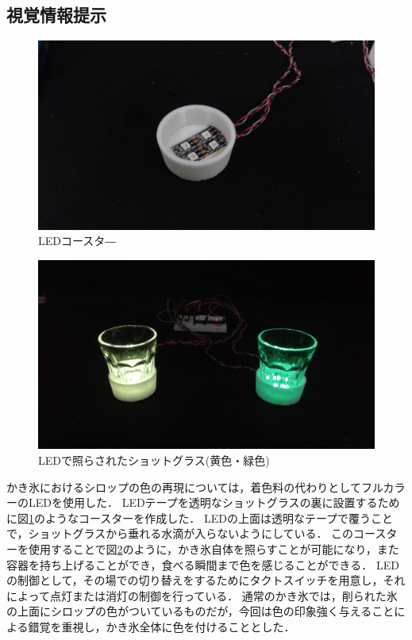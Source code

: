 \subsection{視覚情報提示}
\begin{figure}[t]
  \includegraphics[scale = 0.075]{figs/coaster.jpg}
  \caption{LEDコースタ―}
  \label{coaster}
\end{figure}
\begin{figure}[t]
  \includegraphics[scale = 0.075]{figs/gluss.jpg}
  \caption{LEDで照らされたショットグラス(黄色・緑色)}
  \label{gluss}
\end{figure}


かき氷におけるシロップの色の再現については，着色料の代わりとしてフルカラーのLEDを使用した．
LEDテープを透明なショットグラスの裏に設置するために図\ref{coaster}のようなコースターを作成した．
LEDの上面は透明なテープで覆うことで，ショットグラスから垂れる水滴が入らないようにしている．
このコースターを使用することで図\ref{gluss}のように，かき氷自体を照らすことが可能になり，また容器を持ち上げることができ，食べる瞬間まで色を感じることができる．
LEDの制御として，その場での切り替えをするためにタクトスイッチを用意し，それによって点灯または消灯の制御を行っている．
通常のかき氷では，削られた氷の上面にシロップの色がついているものだが，今回は色の印象強く与えることによる錯覚を重視し，かき氷全体に色を付けることとした．

